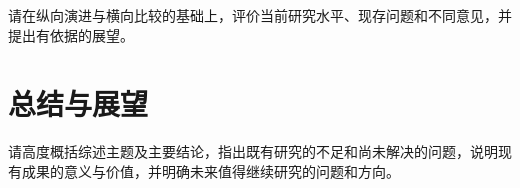 \documentclass{scutreview}
\begin{document}
请在纵向演进与横向比较的基础上，评价当前研究水平、现存问题和不同意见，并提出有依据的展望。

\section{总结与展望}

请高度概括综述主题及主要结论，指出既有研究的不足和尚未解决的问题，说明现有成果的意义与价值，并明确未来值得继续研究的问题和方向。

\printbibliography
\end{document}
